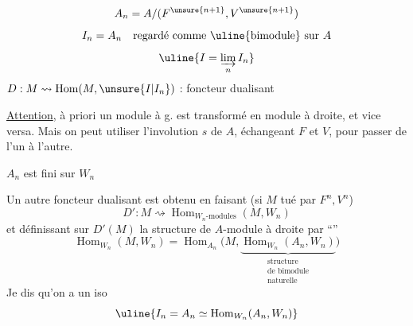 \[
A_n=A/(F^{\unsure{n+1}},V^{\unsure{n+1}})
\]
\[
I_n=A_n\quad\text{regardé comme \uline{bimodule} sur }A
\]
\[
\uline{I=\underset{n}{\varinjlim}\,I_n}
\]
$D:M\rightsquigarrow\operatorname{Hom}(M,\unsure{I|I_n})$ : foncteur dualisant

\uline{Attention}, à priori un module à g. est transformé en module à droite, et vice versa. Mais on peut utiliser l'involution $s$ de $A$, échangeant $F$ et $V$, pour passer de l'un à l'autre.

 $A_n$ est fini sur $W_n$

Un autre foncteur dualisant est obtenu en faisant (si $M$ tué par $F^n,V^n$)
\[
D':M\rightsquigarrow\operatorname{Hom}_{W_n\text{-modules}}(M,W_n)
\]
et définissant sur $D'(M)$ la structure de $A$-module à droite par ``''
\[
\operatorname{Hom}_{W_n}(M,W_n)=\operatorname{Hom}_{A_n}\bigl(M,\underbrace{\operatorname{Hom}_{W_n}(A_n,W_n)}_{\substack{\text{structure}\\\text{de bimodule}\\\text{naturelle}}}\bigr)
\]
Je dis qu'on a un iso
\[
\uline{I_n=A_n\simeq\operatorname{Hom}_{W_n}(A_n,W_n)}
\]
